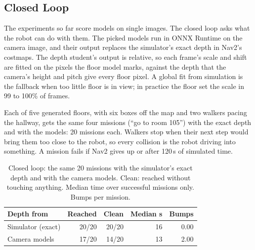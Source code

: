 \documentclass[conference]{IEEEtran}
\begin{document}
\subsection{Closed Loop}
\label{sec:loop}

The experiments so far score models on single images. The closed loop asks
what the robot can do with them. The picked models run in ONNX Runtime on
the camera image, and their output replaces the simulator's exact depth in
Nav2's costmaps. The depth student's output is relative, so each frame's
scale and shift are fitted on the pixels the floor model marks, against the
depth that the camera's height and pitch give every floor pixel. A global
fit from simulation is the fallback when too little floor is in view; in
practice the floor set the scale in 99 to 100\% of frames.

Each of five generated floors, with six boxes off the map and two walkers
pacing the hallway, gets the same four missions (``go to room 105'') with
the exact depth and with the models: 20 missions each. Walkers stop when
their next step would bring them too close to the robot, so every collision
is the robot driving into something. A mission fails if Nav2 gives up or
after 120\,s of simulated time.

\begin{table}[t]
\caption{Closed loop: the same 20 missions with the simulator's exact depth
and with the camera models. Clean: reached without touching anything.
Median time over successful missions only. Bumps per mission.}
\label{tab:loop}
\centering
\small
\begin{tabular}{@{}lrrrr@{}}
\toprule
Depth from & Reached & Clean & Median s & Bumps \\
\midrule
Simulator (exact) & 20/20 & 20/20 & 16 & 0.00 \\
Camera models & 17/20 & 14/20 & 13 & 2.00 \\
\bottomrule
\end{tabular}
\end{table}
\end{document}
